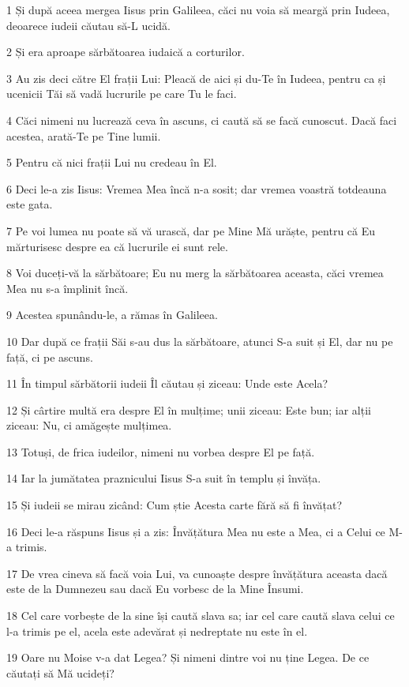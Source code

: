 \par 1 Și după aceea mergea Iisus prin Galileea, căci nu voia să meargă prin Iudeea, deoarece iudeii căutau să-L ucidă.
\par 2 Și era aproape sărbătoarea iudaică a corturilor.
\par 3 Au zis deci către El frații Lui: Pleacă de aici și du-Te în Iudeea, pentru ca și ucenicii Tăi să vadă lucrurile pe care Tu le faci.
\par 4 Căci nimeni nu lucrează ceva în ascuns, ci caută să se facă cunoscut. Dacă faci acestea, arată-Te pe Tine lumii.
\par 5 Pentru că nici frații Lui nu credeau în El.
\par 6 Deci le-a zis Iisus: Vremea Mea încă n-a sosit; dar vremea voastră totdeauna este gata.
\par 7 Pe voi lumea nu poate să vă urască, dar pe Mine Mă urăște, pentru că Eu mărturisesc despre ea că lucrurile ei sunt rele.
\par 8 Voi duceți-vă la sărbătoare; Eu nu merg la sărbătoarea aceasta, căci vremea Mea nu s-a împlinit încă.
\par 9 Acestea spunându-le, a rămas în Galileea.
\par 10 Dar după ce frații Săi s-au dus la sărbătoare, atunci S-a suit și El, dar nu pe față, ci pe ascuns.
\par 11 În timpul sărbătorii iudeii Îl căutau și ziceau: Unde este Acela?
\par 12 Și cârtire multă era despre El în mulțime; unii ziceau: Este bun; iar alții ziceau: Nu, ci amăgește mulțimea.
\par 13 Totuși, de frica iudeilor, nimeni nu vorbea despre El pe față.
\par 14 Iar la jumătatea praznicului Iisus S-a suit în templu și învăța.
\par 15 Și iudeii se mirau zicând: Cum știe Acesta carte fără să fi învățat?
\par 16 Deci le-a răspuns Iisus și a zis: Învățătura Mea nu este a Mea, ci a Celui ce M-a trimis.
\par 17 De vrea cineva să facă voia Lui, va cunoaște despre învățătura aceasta dacă este de la Dumnezeu sau dacă Eu vorbesc de la Mine Însumi.
\par 18 Cel care vorbește de la sine își caută slava sa; iar cel care caută slava celui ce l-a trimis pe el, acela este adevărat și nedreptate nu este în el.
\par 19 Oare nu Moise v-a dat Legea? Și nimeni dintre voi nu ține Legea. De ce căutați să Mă ucideți?
